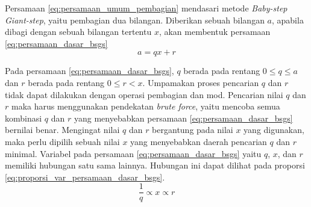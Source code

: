 Persamaan \eqref{eq:persamaan_umum_pembagian} mendasari metode \textit{Baby-step Giant-step}, yaitu pembagian dua bilangan. Diberikan sebuah bilangan $ a $, apabila dibagi dengan sebuah bilangan tertentu $ x $, akan membentuk persamaan \eqref{eq:persamaan_dasar_bsgs}
\begin{equation}
a=qx+r
\label{eq:persamaan_dasar_bsgs}
\end{equation}

Pada persamaan \eqref{eq:persamaan_dasar_bsgs}, $ q $ berada pada rentang $ 0 \leq q \leq a $ dan $ r $ berada pada rentang 
$ 0 \leq r < x $. Umpamakan proses pencarian $ q $ dan $ r $ tidak dapat dilakukan dengan operasi pembagian dan mod. Pencarian nilai $ q $ dan $ r $ maka harus menggunakan pendekatan \textit{brute force}, yaitu mencoba semua kombinasi $ q $ dan $ r $ yang menyebabkan persamaan \eqref{eq:persamaan_dasar_bsgs} bernilai benar. Mengingat nilai $ q $ dan $ r $ bergantung pada nilai $ x $ yang digunakan, maka perlu dipilih sebuah nilai $ x $ yang menyebabkan daerah pencarian $ q $ dan $ r $ minimal. Variabel pada persamaan \eqref{eq:persamaan_dasar_bsgs} yaitu $ q $, $ x $, dan $ r $ memiliki hubungan satu sama lainnya. Hubungan ini dapat dilihat pada proporsi \eqref{eq:proporsi_var_persamaan_dasar_bsgs}.
\begin{equation}
\frac{1}{q} \propto x \propto r
\label{eq:proporsi_var_persamaan_dasar_bsgs}
\end{equation}

